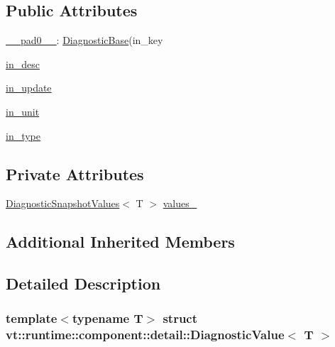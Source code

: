 \subsection*{Public Attributes}
\begin{DoxyCompactItemize}
\item 
\hyperlink{structvt_1_1runtime_1_1component_1_1detail_1_1_diagnostic_value_a073e902389d8b159dd3f9b97fbb3f86d}{\+\_\+\+\_\+pad0\+\_\+\+\_\+}\+: \hyperlink{structvt_1_1runtime_1_1component_1_1detail_1_1_diagnostic_base}{Diagnostic\+Base}(in\+\_\+key
\item 
\hyperlink{structvt_1_1runtime_1_1component_1_1detail_1_1_diagnostic_value_adbdd02ec0fb4f6728257f1e3edacc304}{in\+\_\+desc}
\item 
\hyperlink{structvt_1_1runtime_1_1component_1_1detail_1_1_diagnostic_value_aec6acfffe46afa1fe3c6b48c6f2713a7}{in\+\_\+update}
\item 
\hyperlink{structvt_1_1runtime_1_1component_1_1detail_1_1_diagnostic_value_a828744385fade3c3c803a8f97ae58891}{in\+\_\+unit}
\item 
\hyperlink{structvt_1_1runtime_1_1component_1_1detail_1_1_diagnostic_value_a6a6e8282f975b58b26d8612886e26a5d}{in\+\_\+type}
\end{DoxyCompactItemize}
\subsection*{Private Attributes}
\begin{DoxyCompactItemize}
\item 
\hyperlink{structvt_1_1runtime_1_1component_1_1detail_1_1_diagnostic_snapshot_values}{Diagnostic\+Snapshot\+Values}$<$ T $>$ \hyperlink{structvt_1_1runtime_1_1component_1_1detail_1_1_diagnostic_value_a5f2fd96bc51a48245763ebb2d0c224c7}{values\+\_\+}
\end{DoxyCompactItemize}
\subsection*{Additional Inherited Members}


\subsection{Detailed Description}
\subsubsection*{template$<$typename T$>$\newline
struct vt\+::runtime\+::component\+::detail\+::\+Diagnostic\+Value$<$ T $>$}


